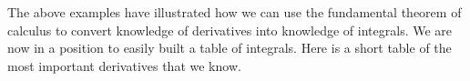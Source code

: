 \begin{eg}
\begin{comment}
\item For this example, the correct computation is
\begin{align*}
\int_{-1}^1\frac{1}{x^2}\dee{x}
&=\lim_{t\rightarrow 0^+}\int_{-1}^{-t}\frac{1}{x^2}\dee{x}
\ +\ \lim_{T\rightarrow 0^+}\int_{T}^{1}\frac{1}{x^2}\dee{x} \\[0.05in]
&=\lim_{t\rightarrow 0^+}\bigg[-\frac{1}{x}\bigg]_{-1}^{-t}
+\lim_{T\rightarrow 0^+}\bigg[-\frac{1}{x}\bigg]_{T}^1
               \displaybreak[0]\\[0.05in]
&=\lim_{t\rightarrow 0^+}
       \Big[\Big(-\frac{1}{-t}\Big)-\Big(-\frac{1}{-1}\Big)\Big]
+\lim_{T\rightarrow 0^+}
         \Big[\Big(-\frac{1}{1}\Big)-\Big(-\frac{1}{T}\Big)\Big]
               \displaybreak[0]\\[0.05in]
&=\lim_{t\rightarrow 0^+}\frac{1}{t}
  +\lim_{T\rightarrow 0^+}\frac{1}{T}-2 \\[0.05in]
&=+\infty
\end{align*}
\item We can interpret this to mean that the signed area under the curve $x^{-2}$ between
$x=-1$ and $x=1$ is infinite.
\end{itemize}
\end{comment}

\end{eg}

The above examples have illustrated how we can use the fundamental
theorem of calculus to convert knowledge of derivatives into
knowledge of integrals.
We are now in a position to easily built a table of integrals. Here is
a short table of the most important derivatives that we know.


